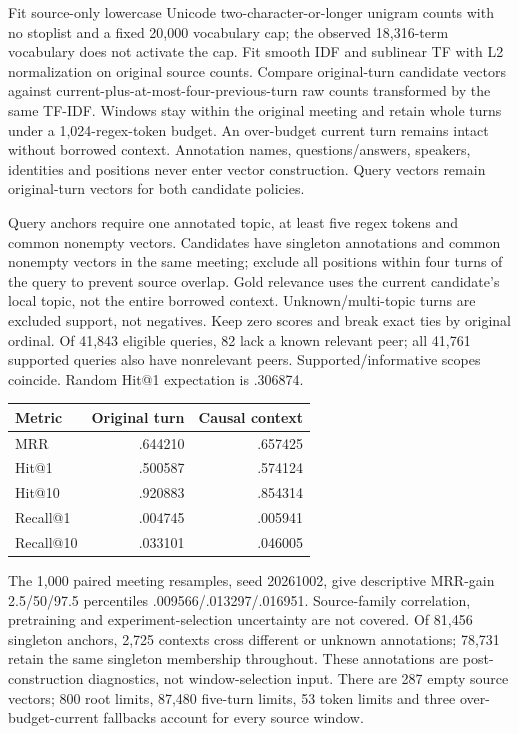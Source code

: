 \documentclass[11pt]{article}
\begin{document}
Fit source-only lowercase Unicode two-character-or-longer unigram counts with
no stoplist and a fixed 20,000 vocabulary cap; the observed 18,316-term vocabulary
does not activate the cap. Fit smooth IDF and sublinear TF with L2 normalization
on original source counts. Compare original-turn candidate vectors against
current-plus-at-most-four-previous-turn raw counts transformed by the same
TF-IDF. Windows stay within the original meeting and retain whole turns under
a 1,024-regex-token budget. An over-budget current turn remains intact without
borrowed context. Annotation names, questions/answers, speakers, identities and
positions never enter vector construction. Query vectors remain original-turn
vectors for both candidate policies.

Query anchors require one annotated topic, at least five regex tokens and
common nonempty vectors. Candidates have singleton annotations and common
nonempty vectors in the same meeting; exclude all positions within four turns
of the query to prevent source overlap. Gold relevance uses the current
candidate's local topic, not the entire borrowed context. Unknown/multi-topic
turns are excluded support, not negatives. Keep zero scores and break exact ties
by original ordinal. Of 41,843 eligible queries, 82 lack a known relevant peer;
all 41,761 supported queries also have nonrelevant peers. Supported/informative
scopes coincide. Random Hit@1 expectation is .306874.

\begin{center}
\begin{tabular}{lrr}
Metric & Original turn & Causal context\\\hline
MRR & .644210 & .657425\\
Hit@1 & .500587 & .574124\\
Hit@10 & .920883 & .854314\\
Recall@1 & .004745 & .005941\\
Recall@10 & .033101 & .046005
\end{tabular}
\end{center}
The 1,000 paired meeting resamples, seed 20261002, give descriptive MRR-gain
2.5/50/97.5 percentiles .009566/.013297/.016951. Source-family correlation,
pretraining and experiment-selection uncertainty are not covered. Of 81,456
singleton anchors, 2,725 contexts cross different or unknown annotations;
78,731 retain the same singleton membership throughout. These annotations are
post-construction diagnostics, not window-selection input. There are 287 empty
source vectors; 800 root limits, 87,480 five-turn limits, 53 token limits and
three over-budget-current fallbacks account for every source window.
\end{document}
